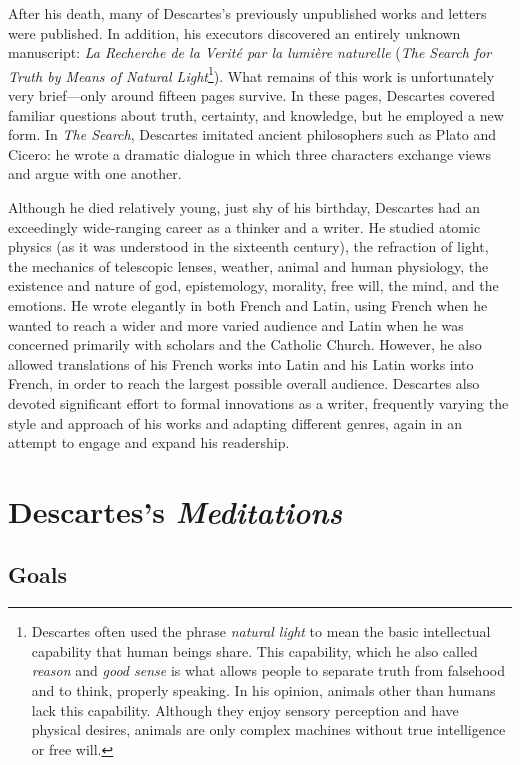 After his death, many of Descartes's previously unpublished works and letters were published. In addition, his executors discovered an entirely unknown manuscript: \textit{La Recherche de la Verité par la lumière naturelle} (\textit{The Search for Truth by Means of Natural Light}\footnote{Descartes often used the phrase \textit{natural light} to mean the basic intellectual capability that human beings share. This capability, which he also called \textit{reason} and \textit{good sense} is what allows people to separate truth from falsehood and to think, properly speaking. In his opinion, animals other than humans lack this capability. Although they enjoy sensory perception and have physical desires, animals are only complex machines without true intelligence or free will.}). What remains of this work is unfortunately very brief---only around fifteen pages survive. In these pages, Descartes covered familiar questions about truth, certainty, and knowledge, but he employed a new form. In \textit{The Search}, Descartes imitated ancient philosophers such as Plato and Cicero: he wrote a dramatic dialogue in which three characters exchange views and argue with one another.

Although he died relatively young, just shy of his  birthday, Descartes had an exceedingly wide-ranging career as a thinker and a writer. He studied atomic physics (as it was understood in the sixteenth century), the refraction of light, the mechanics of telescopic lenses, weather, animal and human physiology, the existence and nature of god, epistemology, morality, free will, the mind, and the emotions. He wrote elegantly in both French and Latin, using French when he wanted to reach a wider and more varied audience and Latin when he was concerned primarily with scholars and the Catholic Church. However, he also allowed translations of his French works into Latin and his Latin works into French, in order to reach the largest possible overall audience. Descartes also devoted significant effort to formal innovations as a writer, frequently varying the style and approach of his works and adapting different genres, again in an attempt to engage and expand his readership.

\section{Descartes's \textit{Meditations}}

\subsection*{Goals}


